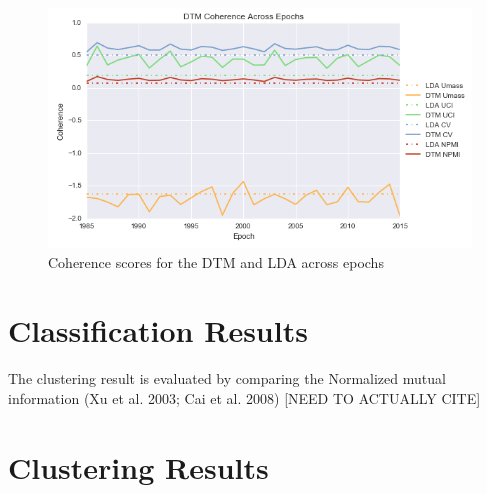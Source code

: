 \begin{figure}[h]
\centering
\includegraphics[width=130mm,scale=0.45]{Figures/DTMCoherences}
\decoRule
\caption[EpochCoherences]{Coherence scores for the DTM and LDA across epochs}
\label{fig:EpochCoherences}
\end{figure}


\section{Classification Results}

The clustering result is evaluated by comparing the Normalized mutual information (Xu et al. 2003; Cai et al. 2008) [NEED TO ACTUALLY CITE]

\section{Clustering Results}

